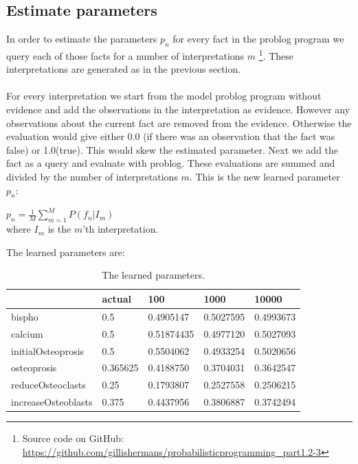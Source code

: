 \documentclass{article}
\begin{document}
\subsection{Estimate parameters}
In order to estimate the parameters $p_{n}$ for every fact in the problog program we query each of those facts for a number of interpretations $m$ \footnote{Source code on GitHub: \href{https://github.com/gillishermans/probabilisticprogramming_part1.2-3}{https://github.com/gillishermans/probabilisticprogramming_part1.2-3}}. These interpretations are generated as in the previous section.\\\\
For every interpretation we start from the model problog program without evidence and add the observations in the interpretation as evidence. However any observations about the current fact are removed from the evidence. Otherwise the evaluation would give either 0.0 (if there was an observation that the fact was false) or 1.0(true). This would skew the estimated parameter. Next we add the fact as a query and evaluate with problog. These evaluations are summed and divided by the number of interpretations $m$. This is the new learned parameter $p_{n}$:
\begin{center}
    $p_{n} = \frac{1}{M} \sum_{m=1}^M P(f_{n}|I_{m}) $\\
    where $I_{m}$ is the $m$'th interpretation.
\end{center}
The learned parameters are:
\begin{table}[h!]
    \begin{center}
    \begin{tabular}{|l|l|l|l|l|}
    \hline
                    & actual   & 100        & 1000      & 10000     \\ \hline
    bispho              & 0.5      & 0.4905147  & 0.5027595 & 0.4993673 \\ \hline
    calcium             & 0.5      & 0.51874435 & 0.4977120 & 0.5027093 \\ \hline
    initialOsteoprosis  & 0.5      & 0.5504062  & 0.4933254 & 0.5020656 \\ \hline
    osteoprosis         & 0.365625 & 0.4188750  & 0.3704031 & 0.3642547 \\ \hline
    reduceOsteoclasts   & 0.25     & 0.1793807  & 0.2527558 & 0.2506215 \\ \hline
    increaseOsteoblasts & 0.375    & 0.4437956  & 0.3806887 & 0.3742494          \\ \hline
    \end{tabular}
    \caption{The learned parameters.}
    \label{tab:param}
    \end{center}
\end{table}
\end{document}

